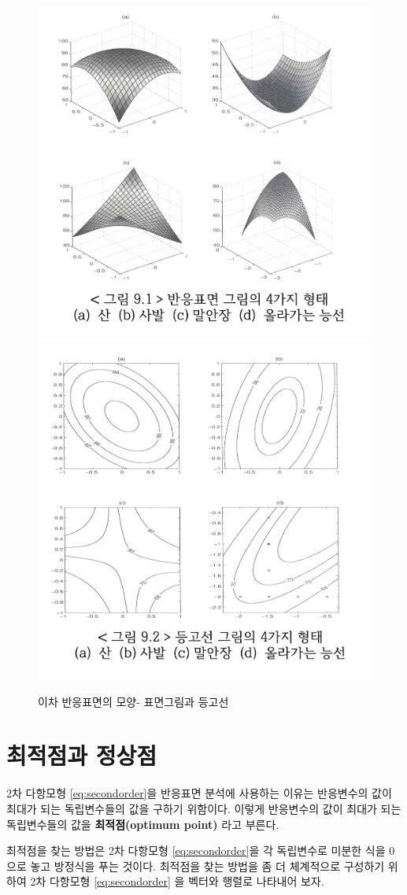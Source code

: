 \documentclass[
]{book}
\theoremstyle{definition}
\theoremstyle{definition}
\theoremstyle{definition}
\theoremstyle{definition}
\theoremstyle{remark}
\begin{document}
\begin{figure}

{\centering \includegraphics[width=0.5\linewidth]{myimages/response-03} \includegraphics[width=0.5\linewidth]{myimages/response-04} 

}

\caption{이차 반응표면의 모양- 표면그림과 등고선}\label{fig:plot3}
\end{figure}

\hypertarget{uxcd5cuxc801uxc810uxacfc-uxc815uxc0c1uxc810}{%
\section{최적점과 정상점}\label{uxcd5cuxc801uxc810uxacfc-uxc815uxc0c1uxc810}}

2차 다항모형 \eqref{eq:secondorder}을 반응표면 분석에 사용하는 이유는 반응변수의 값이 최대가 되는 독립변수들의 값을 구하기 위함이다. 이렇게 반응변수의 값이 최대가 되는 독립변수들의 값을 \textbf{최적점(optimum point)} 라고 부른다.

최적점을 찾는 방법은 2차 다항모형 \eqref{eq:secondorder}을 각 독립변수로 미분한 식을 0으로 놓고 방정식을 푸는 것이다. 최적점을 찾는 방법을 좀 더 체계적으로 구성하기 위하여 2차 다항모형 \eqref{eq:secondorder} 을 벡터와 행렬로 나타내어 보자.
\end{document}
